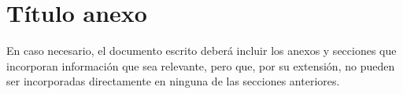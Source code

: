 \chapter{Título anexo}

En caso necesario, el documento escrito deberá incluir los anexos y secciones que incorporan información que sea relevante, pero que, por su extensión, no pueden ser incorporadas directamente en ninguna de las secciones anteriores.